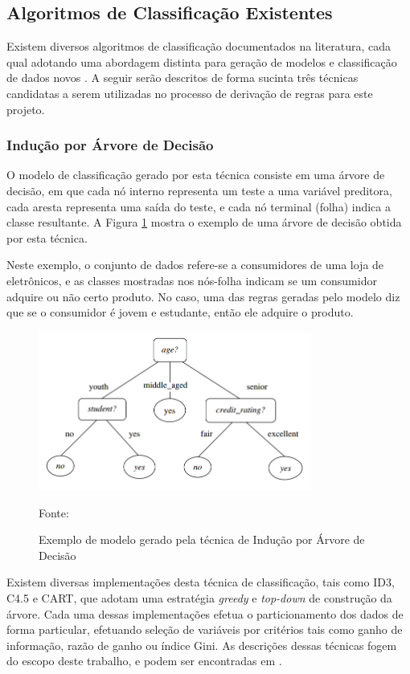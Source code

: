 \subsection{Algoritmos de Classificação Existentes}\label{subsec:algclass}
Existem diversos algoritmos de classificação documentados na literatura, cada qual adotando uma abordagem distinta para geração de modelos e classificação de dados novos \cite{han2005, james2014}. A seguir serão descritos de forma sucinta três técnicas candidatas a serem utilizadas no processo de derivação de regras para este projeto.

\subsubsection{Indução por Árvore de Decisão}
O modelo de classificação gerado por esta técnica consiste em uma árvore de decisão, em que cada nó interno representa um teste a uma variável preditora, cada aresta representa uma saída do teste, e cada nó terminal (folha) indica a classe resultante. A Figura \ref{fig:exemplo_arvore} mostra o exemplo de uma árvore de decisão obtida por esta técnica. 

Neste exemplo, o conjunto de dados refere-se a consumidores de uma loja de eletrônicos, e as classes mostradas nos nós-folha indicam se um consumidor adquire ou não certo produto. No caso, uma das regras geradas pelo modelo diz que se o consumidor é jovem e estudante, então ele adquire o produto.

\begin{figure}[h]
	\centering
	\caption{Exemplo de modelo gerado pela técnica de Indução por Árvore de Decisão}
  \includegraphics[width=0.8\textwidth]{imagens/exemplo_arvore.png}
  \label{fig:exemplo_arvore}  
  
  Fonte: \cite{han2005}
\end{figure}

Existem diversas implementações desta técnica de classificação, tais como ID3, C4.5 e CART, que adotam uma estratégia \textit{greedy} e \textit{top-down} de construção da árvore. Cada uma dessas implementações efetua o particionamento dos dados de forma particular, efetuando seleção de variáveis por critérios tais como ganho de informação, razão de ganho ou índice Gini. As descrições dessas técnicas fogem do escopo deste trabalho, e podem ser encontradas em \cite{han2005}.

